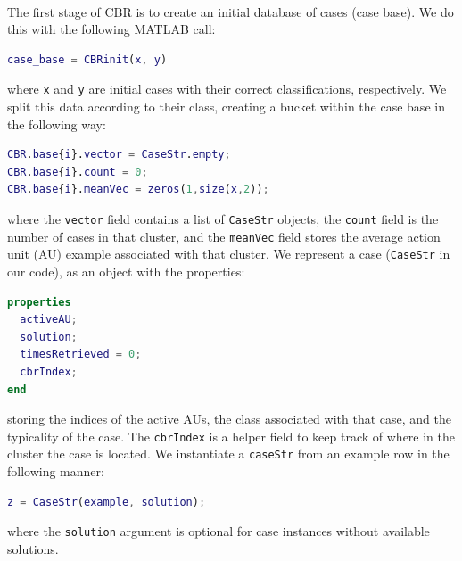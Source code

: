 \documentclass[a4paper,12pt,oneside,final]{report}
\newenvironment{changemargin}[2]{\begin{list}{}{%
\setlength{\topsep}{0pt}%
\setlength{\leftmargin}{0pt}%
\setlength{\rightmargin}{0pt}%
\setlength{\listparindent}{\parindent}%
\setlength{\itemindent}{\parindent}%
\setlength{\parsep}{0pt plus 1pt}%
\addtolength{\leftmargin}{#1}%
\addtolength{\rightmargin}{#2}%
}\item }{\end{list}}
\begin{document}
\paragraph{}
The first stage of CBR is to create an initial database of cases (case base).  We do this with the following MATLAB call:
\begin{changemargin}{-5mm}{-5mm}
\begin{lstlisting}[language=Matlab, frame=single]
case_base = CBRinit(x, y)
\end{lstlisting}
\end{changemargin}
where \verb+x+ and \verb+y+ are initial cases with their correct classifications, respectively.  We split this data according to their class, creating a bucket within the case base in the following way:
\begin{changemargin}{-5mm}{-5mm}
\begin{lstlisting}[language=Matlab, frame=single]
CBR.base{i}.vector = CaseStr.empty;
CBR.base{i}.count = 0;
CBR.base{i}.meanVec = zeros(1,size(x,2));
\end{lstlisting}
\end{changemargin}
where the \verb+vector+ field contains a list of \verb+CaseStr+ objects, the \verb+count+ field is the number of cases in that cluster, and the \verb+meanVec+ field stores the average action unit (AU) example associated with that cluster.  
We represent a case (\verb+CaseStr+ in our code), as an object with the properties:
\begin{changemargin}{-5mm}{-5mm}
\begin{lstlisting}[language=Matlab, frame=single]
properties
  activeAU;
  solution;
  timesRetrieved = 0;
  cbrIndex;
end
\end{lstlisting}
\end{changemargin}
storing the indices of the active AUs, the class associated with that case, and the typicality of the case.  The \verb+cbrIndex+ is a helper field to keep track of where in the cluster the case is located.  We instantiate a \verb+caseStr+ from an example row in the following manner:
\begin{changemargin}{-5mm}{-5mm}
\begin{lstlisting}[language=Matlab, frame=single]
z = CaseStr(example, solution);
\end{lstlisting}
\end{changemargin}
where the \verb+solution+ argument is optional for case instances without available solutions.
\end{document}
